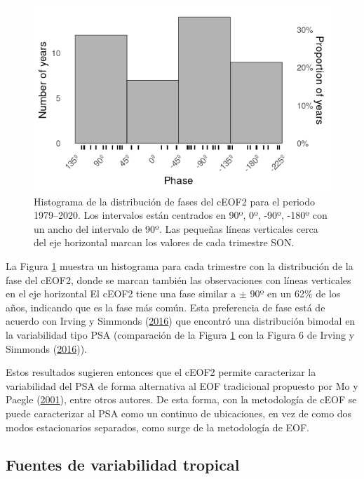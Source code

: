 \documentclass[12pt,oneside,a4paper]{reedthesis}
\begin{document}
\begin{figure}

{\centering \includegraphics{figures/20-ceofs/phase-histogram-1} 

}

\caption{Histograma de la distribución de fases del cEOF2 para el periodo 1979--2020. Los intervalos están centrados en 90º, 0º, -90º, -180º con un ancho del intervalo de 90º. Las pequeñas líneas verticales cerca del eje horizontal marcan los valores de cada trimestre SON.}\label{fig:phase-histogram}
\end{figure}

La Figura \ref{fig:phase-histogram} muestra un histograma para cada trimestre con la distribución de la fase del cEOF2, donde se marcan también las observaciones con líneas verticales en el eje horizontal
El cEOF2 tiene una fase similar a \(\pm\) 90º en un 62\% de los años, indicando que es la fase más común.
Esta preferencia de fase está de acuerdo con Irving y Simmonds (\protect\hyperlink{ref-irving2016}{2016}) que encontró una distribución bimodal en la variabilidad tipo PSA (comparación de la Figura \ref{fig:phase-histogram} con la Figura 6 de Irving y Simmonds (\protect\hyperlink{ref-irving2016}{2016})).

Estos resultados sugieren entonces que el cEOF2 permite caracterizar la variabilidad del PSA de forma alternativa al EOF tradicional propuesto por Mo y Paegle (\protect\hyperlink{ref-mo2001}{2001}), entre otros autores.
De esta forma, con la metodología de cEOF se puede caracterizar al PSA como un continuo de ubicaciones, en vez de como dos modos estacionarios separados, como surge de la metodología de EOF.

\hypertarget{fuentes-ceof}{%
\subsection{Fuentes de variabilidad tropical}\label{fuentes-ceof}}
\end{document}
